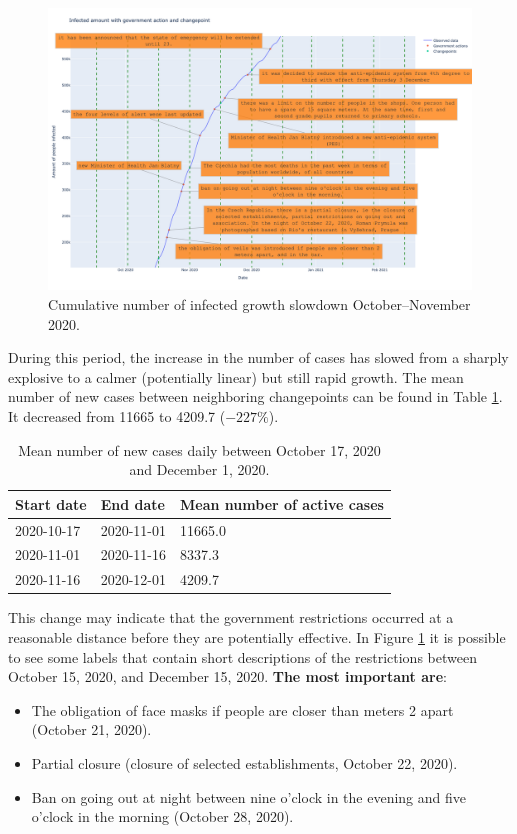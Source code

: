 \begin{figure}[!ht]
\centering
\includegraphics[width=1.0\textwidth, height=0.6\textwidth]{figures/chapter_04/changepoints_vs_government/infecred_expo_to_lin.png}
\caption{Cumulative number of infected growth slowdown October--November 2020.}
\label{fig:corr_inf_e_l}
\end{figure}

During this period, the increase in the number of cases has slowed from a sharply explosive to a calmer (potentially linear) but still rapid growth. The mean number of new cases between neighboring changepoints can be found in Table \ref{tab:new_cases_mean}. It decreased from 11665 to 4209.7 ($-227\%$).

\begin{table}[!htb]
\centering
\begin{tabular}{|l|l|l|}
\hline
Start date & End date & Mean number of active cases \\ \hline
2020-10-17 & 2020-11-01 &   11665.0  \\ \hline
2020-11-01 & 2020-11-16 &   8337.3  \\ \hline
2020-11-16 & 2020-12-01 &   4209.7  \\ \hline
\end{tabular}
\caption{Mean number of new cases daily between October 17, 2020 and December 1, 2020.}
\label{tab:new_cases_mean}
\end{table}

This change may indicate that the government restrictions occurred at a reasonable distance before they are potentially effective. In Figure \ref{fig:corr_inf_e_l} it is possible to see some labels that contain short descriptions of the restrictions between October 15, 2020, and December 15, 2020. \textbf{The most important are}: 
\begin{itemize}
    \item The obligation of face masks if people are closer than meters 2 apart (October 21, 2020).
    \item Partial closure (closure of selected establishments, October 22, 2020).
    \item Ban on going out at night between nine o'clock in the evening and five o'clock in the morning (October 28, 2020).
\end{itemize}

